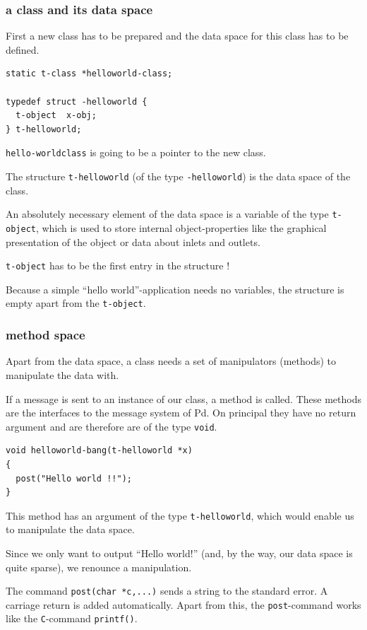 \documentclass{ppgmus}
\begin{document}
\subsubsection{a class and its data space}
First a new class has to be prepared and the data space for this class has to be defined.

\begin{verbatim}
static t-class *helloworld-class;

typedef struct -helloworld {
  t-object  x-obj;
} t-helloworld;
\end{verbatim}

\verb+hello-worldclass+ is going to be a pointer to the new class.

The structure \verb+t-helloworld+ (of the type \verb+-helloworld+) is
the data space of the class.

An absolutely necessary element of the data space is a variable of the type
\verb+t-object+, which is used to store internal object-properties like
the graphical presentation of the object or data about inlets and outlets.

\verb+t-object+ has to be the first entry in the structure !

Because a simple ``hello world''-application needs no variables,
the structure is empty apart from the \verb+t-object+.


\subsubsection{method space}
Apart from the data space, a class needs a set of manipulators (methods) to
manipulate the data with.

If a message is sent to an instance of our class, a method is called.
These methods are the interfaces to the message system of Pd.
On principal they have no return argument and are therefore are of the
type \verb+void+.

\begin{verbatim}
void helloworld-bang(t-helloworld *x)
{
  post("Hello world !!");
}
\end{verbatim}


This method has an argument of the type \verb+t-helloworld+,
which would enable us to manipulate the data space.

Since we only want to output ``Hello world!''
(and, by the way, our data space is quite sparse),
we renounce a manipulation.

The command \verb+post(char *c,...)+ sends a string to the standard error.
A carriage return is added automatically.
Apart from this, the \verb+post+-command works like the {\tt C}-command \verb+printf()+.
\end{document}
